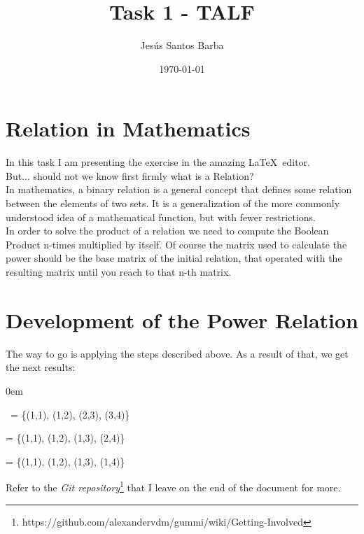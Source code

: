 \documentclass[11pt]{article}
\title{\textbf{Task 1 - TALF}}
\author{Jesús Santos Barba}
\date{\today}
\begin{document}
\maketitle
\thispagestyle{empty}

\section{Relation in Mathematics}
In this task I am presenting the exercise in the amazing \LaTeX \ editor.\\
But... should not we know first firmly what is a Relation?\\
In mathematics, a binary relation is a general concept that defines some relation between the elements of two sets. It is a generalization of the more commonly understood idea of a mathematical function, but with fewer restrictions.\\
In order to solve the product of a relation we need to compute the Boolean Product n-times multiplied by itself. Of course the matrix used to calculate the power should be the base matrix of the initial relation, that operated with the resulting matrix until you reach to that n-th matrix.


\section{Development of the Power Relation}
The way to go is applying the steps described above. As a result of that, we get the next results:
\begin{description}
\addtolength{\itemindent}{0.80cm}
\itemsep0em 
\item[$R$] \   = \{(1,1), (1,2), (2,3), (3,4)\}
\item[$R^{2}$] = \{(1,1), (1,2), (1,3), (2,4)\}
\item[$R^{3}$] = \{(1,1), (1,2), (1,3), (1,4)\}

\end{description}
Refer to the \emph{Git repository}\footnote{https://github.com/alexandervdm/gummi/wiki/Getting-Involved} that I leave on the end of the document for more.
\end{document}
